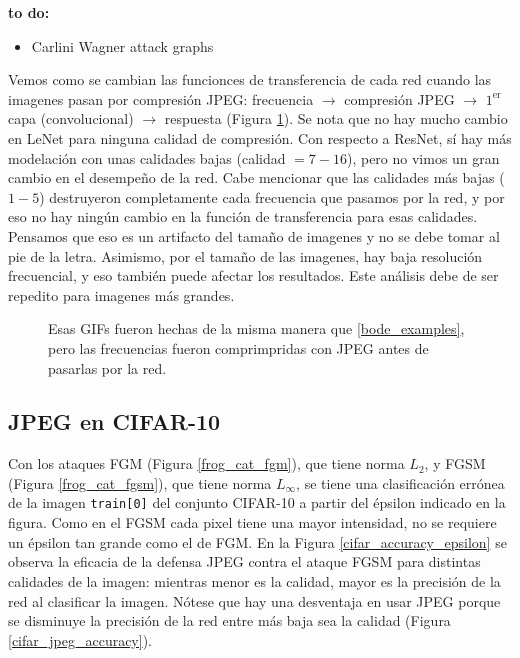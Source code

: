 {\LARGE \textbf{to do:}}
\begin{itemize}
    \item Carlini Wagner attack graphs
\end{itemize}

Vemos como se cambian las funcionces de transferencia de cada red cuando las imagenes pasan por compresión JPEG: frecuencia $\to$ compresión JPEG $\to$ $1^\text{er}$ capa (convolucional) $\to$ respuesta (Figura \ref{bode_gifs}). Se nota que no hay mucho cambio en LeNet para ninguna calidad de compresión. Con respecto a ResNet, sí hay más modelación con unas calidades bajas (calidad $= 7-16$), pero no vimos un gran cambio en el desempeño de la red. Cabe mencionar que las calidades más bajas ($1-5$) destruyeron completamente cada frecuencia que pasamos por la red, y por eso no hay ningún cambio en la función de transferencia para esas calidades. Pensamos que eso es un artifacto del tamaño de imagenes y no se debe tomar al pie de la letra. Asimismo, por el tamaño de las imagenes, hay baja resolución frecuencial, y eso también puede afectar los resultados. Este análisis debe de ser repedito para imagenes más grandes.
\begin{figure}[h]
    \caption{Esas GIFs fueron hechas de la misma manera que \ref{bode_examples}, pero las frecuencias fueron comprimpridas con JPEG antes de pasarlas por la red. }
    \label{bode_gifs}
\end{figure}

\subsection{JPEG en CIFAR-10}

Con los ataques FGM (Figura \ref{frog_cat_fgm}), que tiene norma $L_2$, y FGSM (Figura \ref{frog_cat_fgsm}), que tiene norma $L_\infty$, se tiene una clasificación errónea de la imagen \texttt{train[0]} del conjunto CIFAR-10 a partir del épsilon indicado en la figura. Como en el FGSM cada pixel tiene una mayor intensidad, no se requiere un épsilon tan grande como el de FGM. En la Figura \ref{cifar_accuracy_epsilon} se observa la eficacia de la defensa JPEG contra el ataque FGSM para distintas calidades de la imagen: mientras menor es la calidad, mayor es la precisión de la red al clasificar la imagen. Nótese que hay una desventaja en usar JPEG porque se disminuye la precisión de la red entre más baja sea la calidad (Figura \ref{cifar_jpeg_accuracy}).

